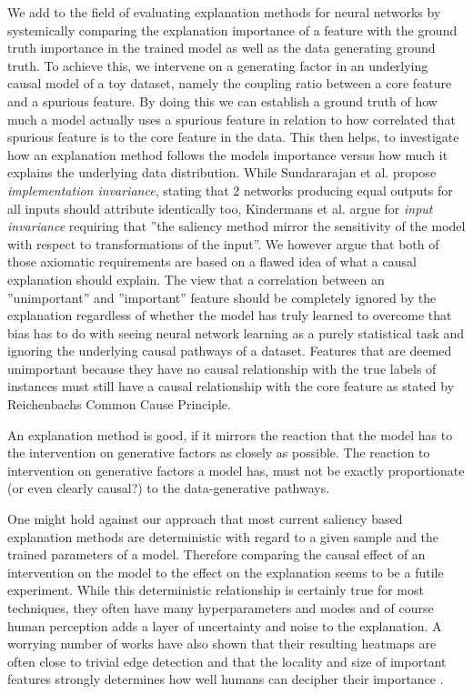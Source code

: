 {We add to the field of evaluating explanation methods for neural networks by systemically comparing the explanation importance of a feature with the ground truth importance in the trained model as well as the data generating ground truth. To achieve this, we intervene on a generating factor in an underlying causal model of a toy dataset, namely the coupling ratio between a core feature and a spurious feature. By doing this we can establish a ground truth of how much a model actually uses a spurious feature in relation to how correlated that spurious feature is to the core feature in the data. This then helps, to investigate how an explanation method follows the models importance versus how much it explains the underlying data distribution. While Sundararajan et al. \cite{Sundararajan2017} propose \textit{implementation invariance}, stating that 2 networks producing equal outputs for all inputs should attribute identically too, Kindermans et al. \cite{Kindermans2019} argue for \textit{input invariance} requiring that ''the saliency method mirror the sensitivity of the model with respect to transformations of the input''.
We however argue that both of those axiomatic requirements are based on a flawed idea of what a causal explanation should explain. 
The view that a correlation between an ''unimportant'' and ''important'' feature should be completely ignored by the explanation regardless of whether the model has truly learned to overcome that bias has to do with seeing neural network learning as a purely statistical task and ignoring the underlying causal pathways of a dataset. 
Features that are deemed unimportant because they have no causal relationship with the true labels of instances must still have a causal relationship with the core feature as stated by Reichenbachs Common Cause Principle. 

An explanation method is good, if it mirrors the reaction that the model has to the intervention on generative factors as closely as possible. The reaction to intervention on generative factors a model has, must not be exactly proportionate (or even clearly causal?) to the data-generative pathways.

One might hold against our approach that most current saliency based explanation methods are deterministic with regard to a given sample and the trained parameters of a model. Therefore comparing the causal effect of an intervention on the model to the effect on the explanation seems to be a futile experiment. While this deterministic relationship is certainly true for most techniques, they often have many hyperparameters and modes and of course human perception adds a layer of uncertainty and noise to the explanation. A worrying number of works have also shown that their resulting heatmaps are often close to trivial edge detection \cite{Adebayo2018} and that the locality and size of important features strongly determines how well humans can decipher their importance .


}
